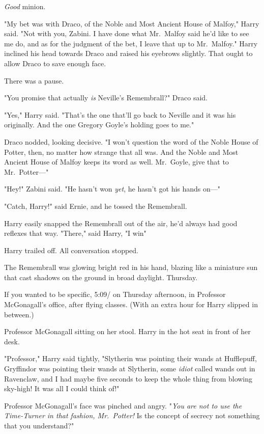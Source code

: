 \emph{Good} minion.

"My bet was with Draco, of the Noble and Most Ancient House of Malfoy," Harry
said. "Not with you, Zabini. I have done what Mr.~Malfoy said he'd like to see
me do, and as for the judgment of the bet, I leave that up to Mr.~Malfoy."
Harry inclined his head towards Draco and raised his eyebrows slightly. That
ought to allow Draco to save enough face.

There was a pause.

"You promise that actually \emph{is} Neville's Remembrall?" Draco said.

"Yes," Harry said. "That's the one that'll go back to Neville and it was his
originally. And the one Gregory Goyle's holding goes to me."

Draco nodded, looking decisive. "I won't question the word of the Noble House
of Potter, then, no matter how strange that all was. And the Noble and Most
Ancient House of Malfoy keeps its word as well. Mr.~Goyle, give that to
Mr.~Potter\mbox{---}"

"Hey!" Zabini said. "He hasn't won \emph{yet}, he hasn't got his hands on\mbox{---}"

"Catch, Harry!" said Ernie, and he tossed the Remembrall.

Harry easily snapped the Remembrall out of the air, he'd always had good
reflexes that way. "There," said Harry, "I win{\el}"

Harry trailed off. All conversation stopped.

The Remembrall was glowing bright red in his hand, blazing like a miniature sun
that cast shadows on the ground in broad daylight.
\sbreak
Thursday.

If you wanted to be specific, 5:09\PM/ on Thursday afternoon, in Professor
McGonagall's office, after flying classes. (With an extra hour for Harry
slipped in between.)

Professor McGonagall sitting on her stool. Harry in the hot seat in front of
her desk.

"Professor," Harry said tightly, "Slytherin was pointing their wands at
Hufflepuff, Gryffindor was pointing their wands at Slytherin, some \emph{idiot}
called wands out in Ravenclaw, and I had maybe five seconds to keep the whole
thing from blowing sky-high! It was all I could think of!"

Professor McGonagall's face was pinched and angry. "\emph{You are not to use
the Time-Turner in that fashion, Mr.~Potter!} Is the concept of secrecy not
something that you understand?"

